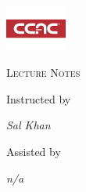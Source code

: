 \documentclass[a4paper,11pt,twoside]{report}
\begin{document}
{\centering
	\includegraphics[width=0.15\textwidth]{../../../.banner/banner.jpg}\par\vspace{1cm}
	{\scshape\LARGE Lecture Notes \par}\vspace{1cm}{\huge\bfseries Physics\par}
	\vspace{.5cm}{\large Spring 2020 \par}\vspace{.5cm}{\Large\itshape Jasper Runco \par}
	\vfill Instructed by \par{\large \itshape Sal Khan \par} Assisted by \par
{\large \itshape n/a \par}} \newpage \tableofcontents \listoffigures \pagestyle{plain}
	
	
\end{document}
